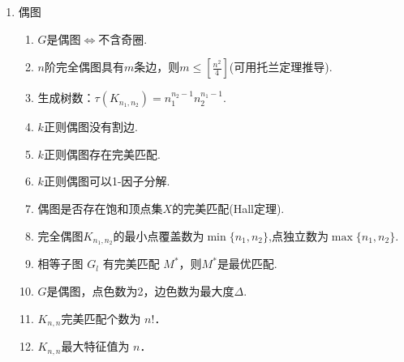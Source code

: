 \begin{enumerate}
\item 偶图
\begin{enumerate}
	\item $G$是偶图$\Leftrightarrow$不含奇圈.
	\item $n$阶完全偶图具有$m$条边，则$m\leq \left[\frac{n^2}{4}\right]$(可用托兰定理推导).
	\item 生成树数：$\tau(K_{n_1,n_2})=n_1^{n_2-1}n_2^{n_1-1}$.
	\item $k$正则偶图没有割边.
	\item $k$正则偶图存在完美匹配.
	\item $k$正则偶图可以1-因子分解.
	\item 偶图是否存在饱和顶点集$X$的完美匹配(Hall定理).
	\item 完全偶图$K_{n_1,n_2}$的最小点覆盖数为$\min\{n_1,n_2\}$,点独立数为$\max\{n_1,n_2\}$.
	\item 相等子图 $G_l$ 有完美匹配 $M^{*}$，则$M^{*}$是最优匹配.
	\item $G$是偶图，点色数为2，边色数为最大度$\varDelta$.
	\item $K_{n,n}$完美匹配个数为 $n!$．
	\item $K_{n,n}$最大特征值为 $n$．
\end{enumerate}
\end{enumerate}